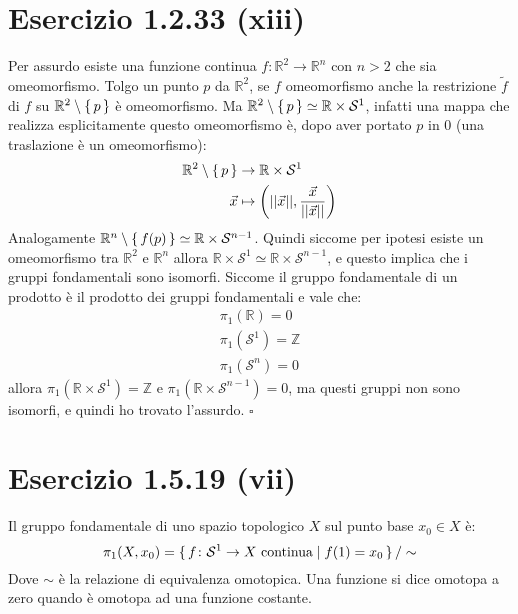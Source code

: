 \documentclass[10pt]{scrartcl}
\newcommand{\Z}{\mathbb{Z}}
\newcommand{\Sph}[1][]{\mathcal{S}^#1}
\begin{document}
\section{Esercizio 1.2.33 (xiii)}
Per assurdo esiste una funzione continua $ f \colon \mathbb{R}^2 \to \mathbb{R}^n $
con $ n > 2 $ che sia omeomorfismo. Tolgo un punto $ p $ da $ \mathbb{R}^2 $,
se $ f $ omeomorfismo anche la restrizione $ \tilde{f} $ di $ f $ su
$ \mathbb{R}^2 \setminus \set{p} $ è omeomorfismo.
Ma  $ \mathbb{R}^{2} \setminus  \set{p} \simeq \mathbb{R} \times \mathcal{S}^1 $, infatti una mappa
che realizza esplicitamente questo omeomorfismo è, dopo aver portato $ p $ in $ 0 $
(una traslazione è un omeomorfismo):
\begin{align*}
  \mathbb{R}^{2} \setminus \set{p} & \to \mathbb{R} \times \mathcal{S}^1 \\
  \vec{x} & \mapsto \left( || \vec{x} ||, \frac{\vec{x}}{|| \vec{x} ||} \right)
\end{align*}
Analogamente $ \mathbb{R}^{n} \setminus \set{f(p)}  \simeq \mathbb{R} \times \Sph{n-1} $.
Quindi siccome per ipotesi esiste un omeomorfismo tra $ \mathbb{R}^{2} $ e
$ \mathbb{R}^{n} $ allora $ \mathbb{R} \times \Sph{1} \simeq \mathbb{R} \times \Sph{n-1} $,
e questo implica che i gruppi fondamentali sono isomorfi.
Siccome il gruppo fondamentale di un prodotto è il prodotto dei gruppi fondamentali
e vale che:
\begin{gather*}
  \pi_1(\mathbb{R}) = 0 \\
  \pi_1(\Sph{1}) = \Z \\
  \pi_1(\Sph{n}) = 0
\end{gather*}
allora $ \pi_1 (\mathbb{R} \times \Sph{1}) = \Z $ e $ \pi_1(\mathbb{R} \times \Sph{n-1}) = 0 $, ma
questi gruppi non sono isomorfi, e quindi ho trovato l'assurdo.
\hfill $ \square $


\section{Esercizio 1.5.19 (vii)}
Il gruppo fondamentale di uno spazio topologico $ X $ sul punto base $ x_0 \in X $
è:
\[
  \pi_1(X,x_0) = \set{ f \colon \Sph{1} \to X \text{ continua} | f(1) = x_0 } \slash \sim
\]
Dove $ \sim $ è la relazione di equivalenza omotopica. Una funzione si dice
omotopa a zero quando è omotopa ad una funzione costante.
\end{document}
